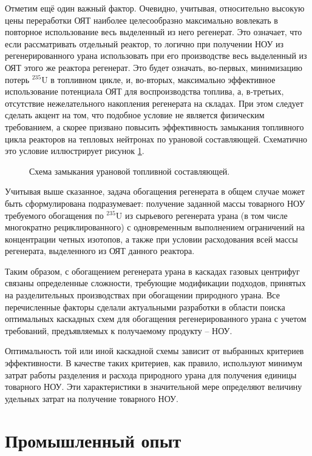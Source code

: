 Отметим ещё один важный фактор. Очевидно, учитывая, относительно высокую цены переработки ОЯТ наиболее целесообразно максимально вовлекать в повторное использование весь выделенный из него регенерат. Это означает, что если рассматривать отдельный реактор, то логично при получении НОУ из регенерированного урана использовать при его производстве весь выделенный из ОЯТ этого же реактора регенерат. Это будет означать, во-первых, минимизацию потерь $^{235}$U в топливном цикле, и, во-вторых, максимально эффективное использование потенциала ОЯТ для воспроизводства топлива, а, в-третьих, отсутствие нежелательного накопления регенерата на складах. При этом следует сделать акцент на том, что подобное условие не является физическим требованием, а скорее призвано повысить эффективность замыкания топливного цикла реакторов на тепловых нейтронах по урановой составляющей. Схематично это условие иллюстрирует рисунок \ref{reconeto}.

\begin{figure}[ht]
  \caption{Схема замыкания урановой топливной составляющей.}\label{reconeto}
\end{figure}


Учитывая выше сказанное, задача обогащения регенерата в общем случае может быть сформулирована подразумевает: получение заданной массы товарного НОУ требуемого обогащения по $^{235}$U из сырьевого регенерата урана (в том числе многократно рециклированного) с одновременным выполнением ограничений на концентрации четных изотопов, а также при условии расходования всей массы регенерата, выделенного из ОЯТ данного реактора.

Таким образом, с обогащением регенерата урана в каскадах газовых центрифуг связаны определенные сложности, требующие модификации подходов, принятых на разделительных производствах при обогащении природного урана. Все перечисленные факторы сделали актуальными разработки в области поиска оптимальных каскадных схем для обогащения регенерированного урана с учетом требований, предъявляемых к получаемому продукту -- НОУ.

Оптимальность той или иной каскадной схемы зависит от выбранных критериев эффективности. В качестве таких критериев, как правило, используют минимум затрат работы разделения и расхода природного урана для получения единицы товарного НОУ. Эти характеристики в значительной мере определяют величину удельных затрат на получение товарного НОУ.


\section{Промышленный опыт}\label{sec:ch1/sec1}

